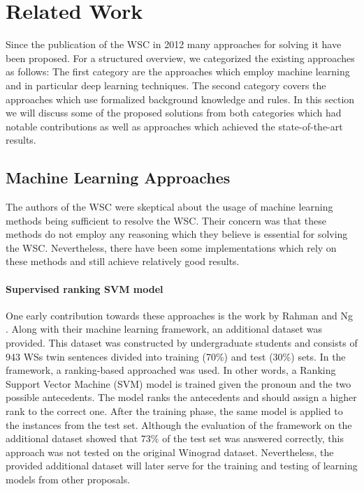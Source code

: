 \section{Related Work}
\label{section:TheDifferentApproaches}

Since the publication of the WSC in 2012 many approaches for solving it have been proposed. For a structured overview, we categorized the existing approaches as follows: The first category are the approaches which employ machine learning and in particular deep learning techniques. 
The second category covers the approaches which use formalized background knowledge and rules. 
In this section we will discuss some of the proposed solutions from both categories which had notable contributions as well as approaches which achieved the state-of-the-art results.

\begin{comment}
Main challenge for rule base systems: how to obtain non-domain specific knowledge base; how to reason on top of that; if predefined as Peter's too constraint

Main challenge for ML approaches: not enough reasoning, it's learning statistic, with small changes would fail
Good approach: knowledge hunting frameworks; maybe recognizing different subsets of sentences
\end{comment}

\subsection{Machine Learning Approaches}
The authors of the WSC were skeptical about the usage of machine learning methods being sufficient to resolve the WSC. Their concern was that these methods do not employ any reasoning which they believe is essential for solving the WSC. 
Nevertheless, there have been some implementations which rely on these methods and still achieve relatively good results. 

\paragraph{Supervised ranking SVM model}
One early contribution towards these approaches is the work by Rahman and Ng \cite{DBLP:conf/emnlp/RahmanN12}. Along with their machine learning framework, an additional dataset was provided. This dataset was constructed by undergraduate students and consists of 943 WSs twin sentences divided into training (70\%) and test (30\%) sets. In the framework, a ranking-based approached was used. In other words, a Ranking Support Vector Machine (SVM) model \cite{DBLP:conf/kdd/Joachims02} is trained given the pronoun and the two possible antecedents. The model ranks the antecedents and should assign a higher rank to the correct one. After the training phase, the same model is applied to the instances from the test set. Although the evaluation of the framework on the additional dataset showed that 73\% of the test set was answered correctly, this approach was not tested on the original Winograd dataset.  Nevertheless, the provided additional dataset will later serve for the training and testing of learning models from other proposals. 

